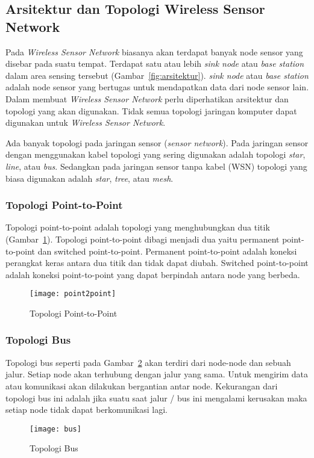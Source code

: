 \subsection{Arsitektur dan Topologi Wireless Sensor Network}
Pada \textit{Wireless Sensor Network} biasanya akan terdapat banyak node sensor yang disebar pada suatu tempat. Terdapat satu atau lebih \textit{sink node} atau \textit{base station} dalam area sensing tersebut (Gambar~\ref{fig:arsitektur}). \textit{sink node} atau \textit{base station} adalah node sensor yang bertugas untuk mendapatkan data dari node sensor lain. Dalam membuat \textit{Wireless Sensor Network} perlu diperhatikan arsitektur dan topologi yang akan digunakan. Tidak semua topologi jaringan komputer dapat digunakan untuk \textit{Wireless Sensor Network}. 

Ada banyak topologi pada jaringan sensor (\textit{sensor network}). Pada jaringan sensor dengan menggunakan kabel topologi yang sering digunakan adalah topologi \textit{star}, \textit{line}, atau \textit{bus}. Sedangkan pada jaringan sensor tanpa kabel (WSN) topologi yang biasa digunakan adalah \textit{star}, \textit{tree}, atau \textit{mesh}. 

\subsubsection{Topologi Point-to-Point}
Topologi point-to-point adalah topologi yang menghubungkan dua titik (Gambar~\ref{fig:point2point}). Topologi point-to-point dibagi menjadi dua yaitu permanent point-to-point dan switched point-to-point. Permanent point-to-point adalah koneksi perangkat keras antara dua titik dan tidak dapat diubah. Switched point-to-point adalah koneksi point-to-point yang dapat berpindah antara node yang berbeda. 
\begin{figure} [H]
	\centering  
	\texttt{[image: point2point]}  
	\caption[Topologi Point-to-Point]{Topologi Point-to-Point} 
	\label{fig:point2point} 
\end{figure} 

\subsubsection{Topologi Bus}
Topologi bus seperti pada Gambar~\ref{fig:bus} akan terdiri dari node-node dan sebuah jalur. Setiap node akan terhubung dengan jalur yang sama. Untuk mengirim data atau komunikasi akan dilakukan bergantian antar node. Kekurangan dari topologi bus ini adalah jika suatu saat jalur / bus ini mengalami kerusakan maka setiap node tidak dapat berkomunikasi lagi.
\begin{figure} [H]
	\centering  
	\texttt{[image: bus]}  
	\caption[Topologi Bus]{Topologi Bus} 
	\label{fig:bus} 
\end{figure} 

